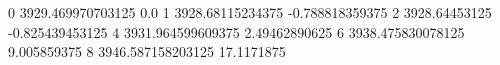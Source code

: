 0 3929.469970703125 0.0
1 3928.68115234375 -0.788818359375
2 3928.64453125 -0.825439453125
4 3931.964599609375 2.49462890625
6 3938.475830078125 9.005859375
8 3946.587158203125 17.1171875
